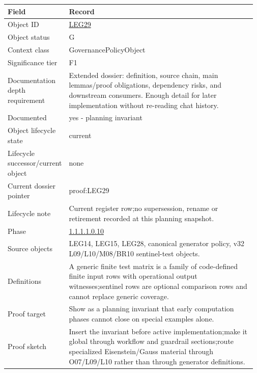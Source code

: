 \begin{longtable}{L{0.16\linewidth} L{0.81\linewidth}}
\hline
\textbf{Field} & \textbf{Record}\\
\hline
Object ID & \hyperlink{object-row-LEG29}{LEG29}\\
\hline\addlinespace[0.20em]
Object status & G\\
\hline\addlinespace[0.20em]
Context class & GovernancePolicyObject\\
\hline\addlinespace[0.20em]
Significance tier & F1\\
\hline\addlinespace[0.20em]
Documentation depth requirement & Extended dossier: definition, source chain, main lemmas/\allowbreak{}proof obligations, dependency risks, and downstream consumers. Enough detail for later implementation without re-reading chat history.\\
\hline\addlinespace[0.20em]
Documented & yes - planning invariant\\
\hline\addlinespace[0.20em]
Object lifecycle state & current\\
\hline\addlinespace[0.20em]
Lifecycle successor/\allowbreak{}current object & none\\
\hline\addlinespace[0.20em]
Current dossier pointer & proof:LEG29\\
\hline\addlinespace[0.20em]
Lifecycle note & Current register row;\newline no supersession, rename or retirement recorded at this planning snapshot.\\
\hline\addlinespace[0.20em]
Phase & \hyperlink{phase-row-1-1-1-1-0-10}{1.1.1.1.0.10}\\
\hline\addlinespace[0.20em]
Source objects & LEG14, LEG15, LEG28, canonical generator policy, v32 L09/\allowbreak{}L10/\allowbreak{}M08/\allowbreak{}BR10 sentinel-test objects.\\
\hline\addlinespace[0.20em]
Definitions & A generic finite test matrix is a family of code-defined finite input rows with operational output witnesses;\newline sentinel rows are optional comparison rows and cannot replace generic coverage.\\
\hline\addlinespace[0.20em]
Proof target & Show as a planning invariant that early computation phases cannot close on special examples alone.\\
\hline\addlinespace[0.20em]
Proof sketch & Insert the invariant before active implementation;\newline make it global through workflow and guardrail sections;\newline route specialized Eisenstein/\allowbreak{}Gauss material through O07/\allowbreak{}L09/\allowbreak{}L10 rather than through generator definitions.\\

\end{longtable}
